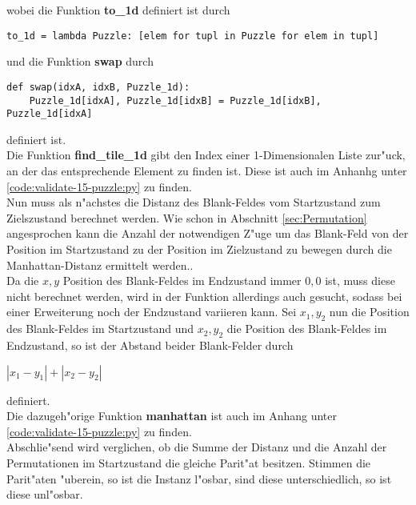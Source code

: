 wobei die Funktion \textbf{to\_1d} definiert ist durch
\vspace{.25cm}
\begin{verbatim}
to_1d = lambda Puzzle: [elem for tupl in Puzzle for elem in tupl]
\end{verbatim}
\vspace{.25cm}
und die Funktion \textbf{swap} durch
\vspace{.25cm}
\begin{verbatim}
def swap(idxA, idxB, Puzzle_1d):
    Puzzle_1d[idxA], Puzzle_1d[idxB] = Puzzle_1d[idxB], Puzzle_1d[idxA]
\end{verbatim}
\vspace{.25cm}
definiert ist.\\
Die Funktion \textbf{find\_tile\_1d} gibt den Index einer 1-Dimensionalen Liste zur"uck, an der das entsprechende Element zu finden ist. Diese ist auch im Anhanhg unter \ref{code:validate-15-puzzle:py} zu finden.\\
Nun muss als n"achstes die Distanz des Blank-Feldes vom Startzustand zum Zielszustand berechnet werden. Wie schon in Abschnitt \ref{sec:Permutation} angesprochen kann die Anzahl der notwendigen Z"uge um das Blank-Feld von der Position im Startzustand zu der Position im Zielzustand zu bewegen durch die Manhattan-Distanz ermittelt werden..\\ Da die $x,y$ Position des Blank-Feldes im Endzustand immer $0,0$ ist, muss diese nicht berechnet werden, wird in der Funktion allerdings auch gesucht, sodass bei einer Erweiterung noch der Endzustand variieren kann.
Sei $x_1,y_2$ nun die Position des Blank-Feldes im Startzustand und $x_2,y_2$ die Position des Blank-Feldes im Endzustand, so ist der Abstand beider Blank-Felder durch \\
\begin{center}
    $\left | x_1 - y_1 \right | + \left | x_2 - y_2 \right |$
\end{center}
definiert.\\
Die dazugeh"orige Funktion \textbf{manhattan} ist auch im Anhang unter \ref{code:validate-15-puzzle:py} zu finden.\\
Abschlie"send wird verglichen, ob die Summe der Distanz und die Anzahl der Permutationen im Startzustand die gleiche Parit"at besitzen. Stimmen die Parit"aten "uberein, so ist die Instanz l"osbar, sind diese unterschiedlich, so ist diese unl"osbar.

